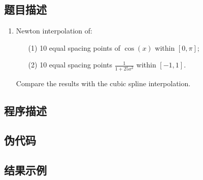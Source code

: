 \subsection{题目描述}
\begin{enumerate}
    \item Newton interpolation of:
    \begin{itemize}
        \item[(1)] 10 equal spacing points of \( \cos(x) \) within \( [0, \pi] \);
        \item[(2)] 10 equal spacing points \( \frac{1}{1 + 25x^2} \) within \([-1, 1]\).
    \end{itemize}
    Compare the results with the cubic spline interpolation.
\end{enumerate}

\subsection{程序描述}


\subsection{伪代码}



\subsection{结果示例}

